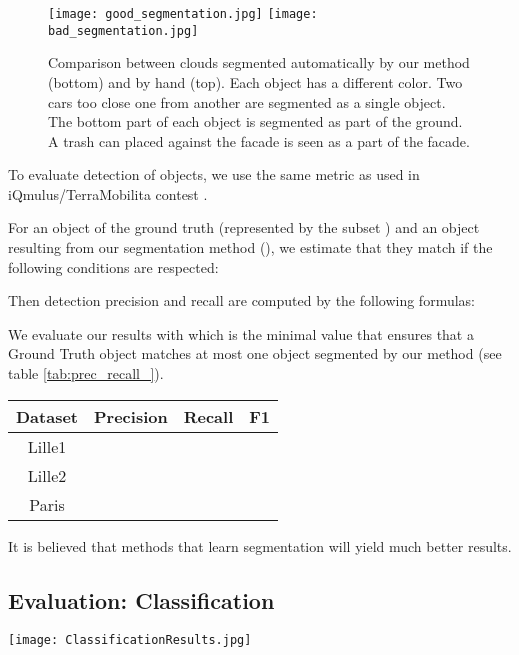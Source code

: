 \documentclass[a4paper, 10pt, journal]{article}
\begin{document}
\begin{figure}[h]\centering
 \texttt{[image: good\_segmentation.jpg]}\vspace{0.2cm}
 \texttt{[image: bad\_segmentation.jpg]}
 \caption{Comparison between clouds segmented automatically by our method (bottom) and by hand (top). Each object has a different color. Two cars too close one from another are segmented as a single object. The bottom part of each object is segmented as part of the ground. A trash can placed against the facade is seen as a part of the facade.\label{fig:segm}}
\end{figure}

To evaluate detection of objects, we use the same metric as used in iQmulus/TerraMobilita contest \cite{vallet2015terramobilita}.

For an object of the ground truth (represented by the subset ) and an object resulting from our segmentation method (), we estimate that they match if the following conditions are respected:


Then detection precision and recall are computed by the following formulas:


We evaluate our results with  which is the minimal value that ensures that a Ground Truth object matches at most one object segmented by our method (see table \ref{tab:prec_recall_}).

\begin{center}
 \sf\centering
 \begin{tabular}{cccc}
 \toprule
  Dataset & Precision & Recall & F1 \\
 \midrule
   Lille1  &  &  & \\
   Lille2  &  &  & \\
   Paris   &  &  & \\
 \bottomrule
 \end{tabular}
\end{center}

It is believed that methods that learn segmentation will yield much better results.

\subsection{Evaluation: Classification}

\begin{center}\centering
 \texttt{[image: ClassificationResults.jpg]}
\end{center}
\end{document}
